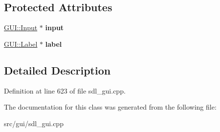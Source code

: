 \subsection*{Protected Attributes}
\begin{DoxyCompactItemize}
\item 
\hypertarget{classPropertyEditorHex_ae4aaff687f15bb4ca498899dcd1d1812}{\hyperlink{classGUI_1_1Input}{G\-U\-I\-::\-Input} $\ast$ {\bfseries input}}\label{classPropertyEditorHex_ae4aaff687f15bb4ca498899dcd1d1812}

\item 
\hypertarget{classPropertyEditorHex_adf21611ca80ad4c2a5fa03d0440c80c0}{\hyperlink{classGUI_1_1Label}{G\-U\-I\-::\-Label} $\ast$ {\bfseries label}}\label{classPropertyEditorHex_adf21611ca80ad4c2a5fa03d0440c80c0}

\end{DoxyCompactItemize}


\subsection{Detailed Description}


Definition at line 623 of file sdl\-\_\-gui.\-cpp.



The documentation for this class was generated from the following file\-:\begin{DoxyCompactItemize}
\item 
src/gui/sdl\-\_\-gui.\-cpp\end{DoxyCompactItemize}
